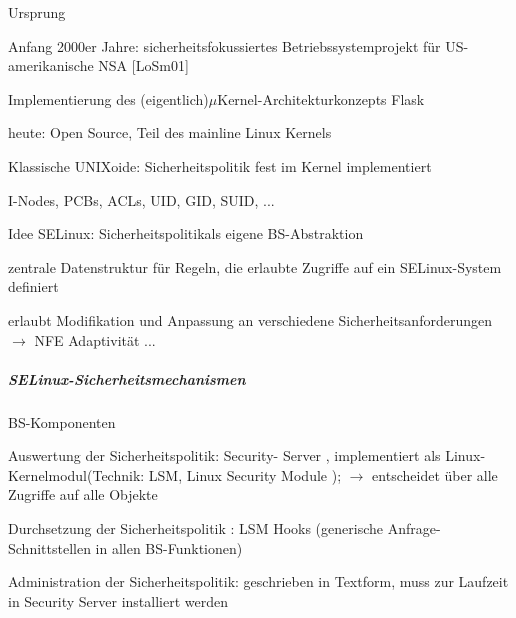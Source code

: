\documentclass[a4paper]{article}
\begin{document}
\begin{multicols}{3}
    \begin{itemize*}
        \item
        Ursprung
        \begin{itemize*}
            \item Anfang 2000er Jahre: sicherheitsfokussiertes Betriebssystemprojekt für US-amerikanische NSA {[}LoSm01{]}
            \item Implementierung des (eigentlich)$\mu$Kernel-Architekturkonzepts Flask
            \item heute: Open Source, Teil des mainline Linux Kernels
        \end{itemize*}
        \item
        Klassische UNIXoide: Sicherheitspolitik fest im Kernel implementiert
        \begin{itemize*}
            \item I-Nodes, PCBs, ACLs, UID, GID, SUID, ...
        \end{itemize*}
        \item
        Idee SELinux: Sicherheitspolitikals eigene BS-Abstraktion
        \begin{itemize*}
            \item zentrale Datenstruktur für Regeln, die erlaubte Zugriffe auf ein SELinux-System definiert
            \item erlaubt Modifikation und Anpassung an verschiedene Sicherheitsanforderungen $\rightarrow$ NFE Adaptivität ...
        \end{itemize*}
    \end{itemize*}


    \subparagraph{SELinux-Sicherheitsmechanismen}

    BS-Komponenten

    \begin{itemize*}
        \item
        Auswertung der Sicherheitspolitik: Security- Server , implementiert
        als Linux-Kernelmodul(Technik: LSM, Linux Security Module );
        $\rightarrow$ entscheidet über alle Zugriffe auf alle
        Objekte
        \item
        Durchsetzung der Sicherheitspolitik : LSM Hooks (generische
        Anfrage-Schnittstellen in allen BS-Funktionen)
        \item
        Administration der Sicherheitspolitik: geschrieben in Textform, muss
        zur Laufzeit in Security Server installiert werden
    \end{itemize*}


\end{multicols}
\end{document}
